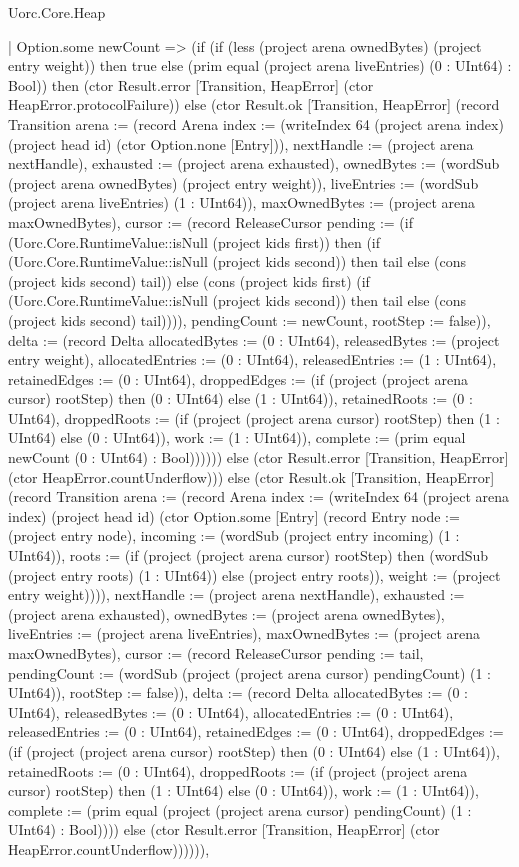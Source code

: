 \begin{lexlean}{Uorc.Core.Heap}
\begin{semanticmodule}
{        | Option.some newCount => (if (if (less (project arena ownedBytes) (project entry weight)) then true else (prim equal (project arena liveEntries) (0 : UInt64) : Bool)) then (ctor Result.error [Transition, HeapError] (ctor HeapError.protocolFailure)) else (ctor Result.ok [Transition, HeapError] (record Transition {arena := (record Arena {index := (writeIndex 64 (project arena index) (project head id) (ctor Option.none [Entry])), nextHandle := (project arena nextHandle), exhausted := (project arena exhausted), ownedBytes := (wordSub (project arena ownedBytes) (project entry weight)), liveEntries := (wordSub (project arena liveEntries) (1 : UInt64)), maxOwnedBytes := (project arena maxOwnedBytes), cursor := (record ReleaseCursor {pending := (if (Uorc.Core.RuntimeValue::isNull (project kids first)) then (if (Uorc.Core.RuntimeValue::isNull (project kids second)) then tail else (cons (project kids second) tail)) else (cons (project kids first) (if (Uorc.Core.RuntimeValue::isNull (project kids second)) then tail else (cons (project kids second) tail)))), pendingCount := newCount, rootStep := false})}), delta := (record Delta {allocatedBytes := (0 : UInt64), releasedBytes := (project entry weight), allocatedEntries := (0 : UInt64), releasedEntries := (1 : UInt64), retainedEdges := (0 : UInt64), droppedEdges := (if (project (project arena cursor) rootStep) then (0 : UInt64) else (1 : UInt64)), retainedRoots := (0 : UInt64), droppedRoots := (if (project (project arena cursor) rootStep) then (1 : UInt64) else (0 : UInt64)), work := (1 : UInt64)}), complete := (prim equal newCount (0 : UInt64) : Bool)}))))) else (ctor Result.error [Transition, HeapError] (ctor HeapError.countUnderflow))) else (ctor Result.ok [Transition, HeapError] (record Transition {arena := (record Arena {index := (writeIndex 64 (project arena index) (project head id) (ctor Option.some [Entry] (record Entry {node := (project entry node), incoming := (wordSub (project entry incoming) (1 : UInt64)), roots := (if (project (project arena cursor) rootStep) then (wordSub (project entry roots) (1 : UInt64)) else (project entry roots)), weight := (project entry weight)}))), nextHandle := (project arena nextHandle), exhausted := (project arena exhausted), ownedBytes := (project arena ownedBytes), liveEntries := (project arena liveEntries), maxOwnedBytes := (project arena maxOwnedBytes), cursor := (record ReleaseCursor {pending := tail, pendingCount := (wordSub (project (project arena cursor) pendingCount) (1 : UInt64)), rootStep := false})}), delta := (record Delta {allocatedBytes := (0 : UInt64), releasedBytes := (0 : UInt64), allocatedEntries := (0 : UInt64), releasedEntries := (0 : UInt64), retainedEdges := (0 : UInt64), droppedEdges := (if (project (project arena cursor) rootStep) then (0 : UInt64) else (1 : UInt64)), retainedRoots := (0 : UInt64), droppedRoots := (if (project (project arena cursor) rootStep) then (1 : UInt64) else (0 : UInt64)), work := (1 : UInt64)}), complete := (prim equal (project (project arena cursor) pendingCount) (1 : UInt64) : Bool)}))) else (ctor Result.error [Transition, HeapError] (ctor HeapError.countUnderflow)))))),
}
\end{semanticmodule}
\end{lexlean}
